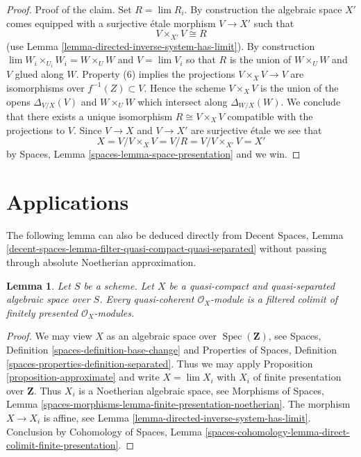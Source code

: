 \documentclass{stacks-project}
\theoremstyle{plain}
\newtheorem{lemma}[subsection]{Lemma}
\theoremstyle{definition}
\theoremstyle{remark}
\numberwithin{equation}{subsection}
\def\lim{\mathop{\mathrm{lim}}\nolimits}
\def\Spec{\mathop{\mathrm{Spec}}}
\begin{document}
\begin{proof}
\medskip\noindent
Proof of the claim. Set $R = \lim R_i$.
By construction the algebraic space $X'$ comes
equipped with a surjective \'etale morphism $V \to X'$ such that
$$
V \times_{X'} V \cong R
$$
(use Lemma \ref{lemma-directed-inverse-system-has-limit}).
By construction $\lim W_i \times_{U_i} W_i = W \times_U W$ and $V = \lim V_i$
so that $R$ is the union of $W \times_U W$ and $V$ glued along $W$.
Property (6) implies the projections $V \times_X V \to V$ are isomorphisms
over $f^{-1}(Z) \subset V$. Hence the scheme $V \times_X V$ is the union
of the opens $\Delta_{V/X}(V)$ and $W \times_U W$ which intersect
along $\Delta_{W/X}(W)$. We conclude that there exists a unique isomorphism
$R \cong V \times_X V$ compatible with the projections to $V$.
Since $V \to X$ and $V \to X'$ are surjective \'etale we see that
$$
X = V/ V \times_X V = V/R = V/V \times_{X'} V = X'
$$
by Spaces, Lemma \ref{spaces-lemma-space-presentation} and we win.
\end{proof}




\section{Applications}
\label{section-applications}

\noindent
The following lemma can also be deduced directly from
Decent Spaces, Lemma
\ref{decent-spaces-lemma-filter-quasi-compact-quasi-separated}
without passing through absolute Noetherian approximation.

\begin{lemma}
\label{lemma-colimit-finitely-presented}
Let $S$ be a scheme. Let $X$ be a quasi-compact and quasi-separated algebraic
space over $S$. Every quasi-coherent $\mathcal{O}_X$-module is a
filtered colimit of finitely presented $\mathcal{O}_X$-modules.
\end{lemma}

\begin{proof}
We may view $X$ as an algebraic space over $\Spec(\mathbf{Z})$, see
Spaces, Definition \ref{spaces-definition-base-change} and
Properties of Spaces, Definition \ref{spaces-properties-definition-separated}.
Thus we may apply Proposition \ref{proposition-approximate}
and write $X = \lim X_i$ with $X_i$ of finite presentation over $\mathbf{Z}$.
Thus $X_i$ is a Noetherian algebraic space, see
Morphisms of Spaces, Lemma
\ref{spaces-morphisms-lemma-finite-presentation-noetherian}.
The morphism $X \to X_i$ is affine, see
Lemma \ref{lemma-directed-inverse-system-has-limit}.
Conclusion by
Cohomology of Spaces, Lemma
\ref{spaces-cohomology-lemma-direct-colimit-finite-presentation}.
\end{proof}
\end{document}
